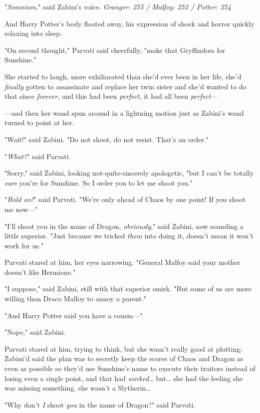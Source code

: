 "\emph{Somnium,}" said Zabini's voice.
\sbreak
\emph{Granger: 255 / Malfoy: 252 / Potter: 254}

And Harry Potter's body floated away, his expression of shock and horror 
quickly relaxing into sleep.

"On second thought," Parvati said cheerfully, "make that Gryffindors for 
Sunshine."

She started to laugh, more exhiliarated than she'd ever been in her life, she'd 
\emph{finally} gotten to assassinate and replace her twin sister and she'd 
wanted to do that since \emph{forever,} and this had been \emph{perfect,} it 
had all been \emph{perfect}---

---and then her wand spun around in a lightning motion just as Zabini's wand 
turned to point at her.

"Wait!" said Zabini. "Do not shoot, do not resist. That's an order."

"\emph{What?}" said Parvati.

"Sorry," said Zabini, looking not-quite-sincerely apologetic, "but I can't be 
totally \emph{sure} you're for Sunshine. So I order you to let me shoot you."

"\emph{Hold on!}" said Parvati. "We're only ahead of Chaos by one point! If you 
shoot me now---"

"I'll shoot you in the name of Dragon, \emph{obviously}," said Zabini, now 
sounding a little superior. "Just because we tricked \emph{them} into doing it, 
doesn't mean it won't work for us."

Parvati stared at him, her eyes narrowing. "General Malfoy said your mother 
doesn't like Hermione."

"I suppose," said Zabini, still with that superior smirk. "But some of us are 
more willing than Draco Malfoy to annoy a parent."

"And Harry Potter said you have a cousin---"

"Nope," said Zabini.

Parvati stared at him, trying to think, but she wasn't really good at plotting; 
Zabini'd said the plan was to secretly keep the scores of Chaos and Dragon as 
even as possible so they'd use Sunshine's name to execute their traitors 
instead of losing even a single point, and that had \emph{worked}{\ldots} 
but{\ldots} she had the feeling she was missing something, she wasn't a 
Slytherin{\ldots}

"Why don't \emph{I} shoot \emph{you} in the name of Dragon?" said Parvati.

